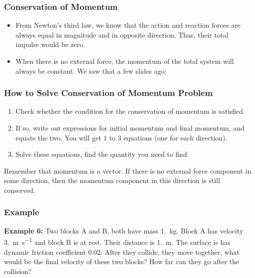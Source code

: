 \documentclass[12pt,compress,aspectratio=169]{beamer}
\newcommand{\mb}[1]{\ensuremath\mathbf{#1}}
\newcommand{\eq}[2]{\vspace{#1}{\Large\begin{displaymath}#2\end{displaymath}}}
\begin{document}
\begin{frame}
  \frametitle{Conservation of Momentum}
  \begin{itemize}
  \item From Newton's third law, we know that the action and reaction forces are
    always equal in magnitude and in opposite direction. Thus, their total
    impulse would be zero. 
    
  \item When there is no external force, the momentum of the total system will
    always be constant. We saw that a few slides ago:

    \eq{-.2in}{
      \sum\mb{p}(t_1)=\sum\mb{p}(t_2)
    }
  \end{itemize}
\end{frame}

\begin{frame}
  \frametitle{How to Solve Conservation of Momentum Problem}
  \begin{enumerate}
  \item Check whether the condition for the conservation of momentum is
    satisfied.
  \item If so, write out expressions for initial momentum and final momentum,
    and equate the two. You will get $1$ to $3$ equations (one for each
    direction).
  \item Solve these equations, find the quantity you need to find.
  \end{enumerate}
%
  Remember that momentum is a vector. If there is no external force component
  in some direction, then the momentum component in this direction is still
  conserved.
\end{frame}

\begin{frame}
  \frametitle{Example}
  \textbf{Example 6:} Two blocks A and B, both have mass \SI{1.}{\kilo\gram}.
  Block A has velocity \SI{3.}{\metre\per\second} and block B is at rest. Their
  distance is \SI{1.}{\metre}. The surface is has dynamic friction coefficient
  $0.02$. After they collide, they move together, what would be the final
  velocity of these two blocks? How far can they go after the collision?
\end{frame}
\end{document}

